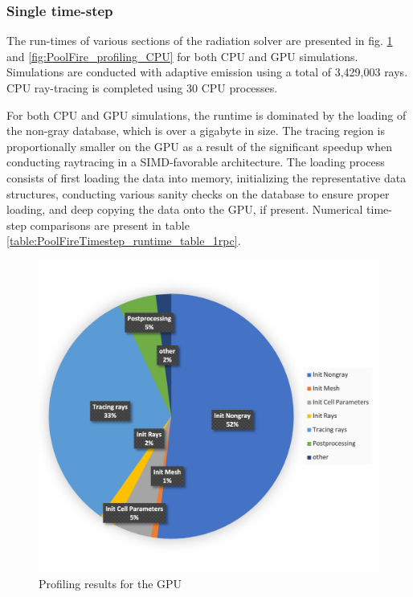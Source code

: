 \subsubsection{Single time-step}
The run-times of various sections of the radiation solver are presented in fig. \ref{fig:PoolFire_profiling} and \ref{fig:PoolFire_profiling_CPU} for both CPU and GPU simulations. Simulations are conducted with adaptive emission using a total of 3,429,003 rays.
CPU ray-tracing is completed using 30 CPU processes. 

For both CPU and GPU simulations, the runtime is dominated by the loading of the non-gray database, which is over a gigabyte in size. 
The tracing region is proportionally smaller on the GPU as a result of the significant speedup when conducting raytracing in a SIMD-favorable architecture.
The loading process consists of first loading the data into memory, initializing the representative data structures, conducting various sanity checks on the database to ensure proper loading, and deep copying the data onto the GPU, if present.
Numerical time-step comparisons are present in table \ref{table:PoolFireTimestep_runtime_table_1rpc}.

\begin{figure}
\centering
\includegraphics[width=0.675\linewidth]{figures/ch4/PoolFire_profiling_OnetimestepGPU.png}
\caption{Profiling results for the GPU}
\label{fig:PoolFire_profiling}
\end{figure}


